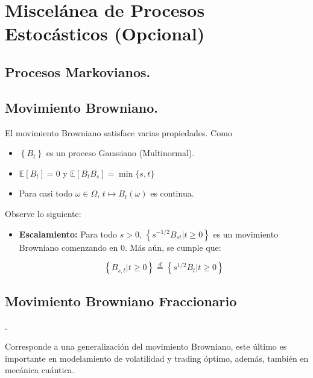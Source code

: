 
\section{Miscelánea de Procesos Estocásticos (Opcional)}

\subsection{Procesos Markovianos.}



\subsection{Movimiento Browniano.}

El movimiento Browniano satisface varias propiedades. Como

\begin{itemize}
	\item $\left\{ B_t \right\}$ es un proceso Gaussiano (Multinormal).
	\item $\mathbb{E}[B_t] = 0$ y $\mathbb{E}[B_t B_s] = \min\{ s, t \}$
	\item Para casi todo $\omega \in \Omega$, $t \mapsto B_t (\omega)$ es continua.
\end{itemize}


Observe lo siguiente:

\begin{itemize}
	\item \textbf{Escalamiento: } Para todo $s > 0$, $\left\{ s^{-1/2} B_{st} \vert t \geq 0 \right\}$ es un movimiento Browniano comenzando en 0. Más aún, se cumple que:

	\[
		\left\{ B_{s,t} \vert t \geq 0 \right\}  \stackrel{d}{=}  \left\{ s^{1/2} B_t \vert t \geq 0 \right\}
	\]
\end{itemize}

\subsection{Movimiento Browniano Fraccionario}.


Corresponde a una generalización del movimiento Browniano, este último es importante en modelamiento de volatilidad y trading óptimo, además, también en mecánica cuántica.


